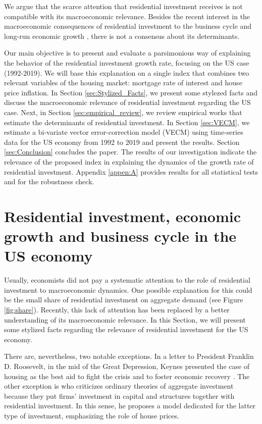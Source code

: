 \documentclass[12pt, a4paper]{article}
\begin{document}
We argue that the scarce attention that residential investment receives is not compatible with its macroeconomic relevance.
Besides the recent interest in the macroeconomic consequences of residential investment to the business cycle and long-run economic growth \cite{fiebiger_trend_2017,fiebiger_semi-autonomous_2018,perez_Montiel_2021}, there is not a consensus about its determinants.

Our main objective is to present and evaluate a parsimonious way of explaining the behavior of the residential investment growth rate, focusing on the US case (1992-2019).
We will base this explanation on a single index that combines two relevant variables of the housing market: mortgage rate of interest and house price inflation.
In Section \ref{sec:Stylized_Facts}, we present some stylezed facts and discuss the macroeconomic relevance of residential investment regarding the US case.
Next, in Section \ref{sec:empirical_review}, we review empirical works that estimate the determinants of residential investment.
In Section \ref{sec:VECM}, we estimate a bi-variate vector error-correction model (VECM) using time-series data for the US economy from 1992 to 2019 and present the results.
Section \ref{sec:Conclusion} concludes the paper.
The results of our investigation indicate the relevance of the proposed index in explaining the dynamics of the growth rate of residential investment.
Appendix \ref{appen:A} provides results for all statistical tests and for the robustness check.



\section{Residential investment, economic growth and business cycle in the US economy}
\label{sec:org8b69c00}
\label{sec:Stylized_Facts}
Usually, economists did not pay a systematic attention to the role of residential investment to macroeconomic dynamics.
One possible explanation for this could be the small share of residential investment on aggregate demand (see Figure \ref{fig:share}).
Recently, this lack of attention has been replaced by a better understanding of its macroeconomic relevance.
In this Section, we will present some stylized facts regarding the relevance of residential investment for the US economy.

There are, nevertheless, two notable exceptions.
In a letter to President Franklin D. Roosevelt, in the mid of the Great Depression, Keynes presented the case of housing as the best aid to fight the crisis and to foster economic recovery \cite[p.~436]{keynes_collected_1978}.
The other exception is \textcite{duesenberry_investment_1958} who criticizes ordinary theories of aggregate investment because they put firms’ investment in capital and structures together with residential investment.
In this sense, he proposes a model dedicated for the latter type of investment, emphasizing the role of house prices.
\end{document}

